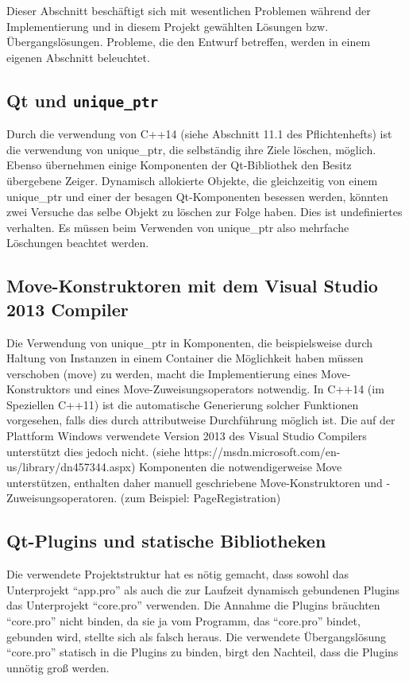 Dieser Abschnitt beschäftigt sich mit wesentlichen Problemen während der 
Implementierung und in diesem Projekt gewählten Lösungen bzw. Übergangslösungen.
Probleme, die den Entwurf betreffen, werden in einem eigenen Abschnitt beleuchtet.

\subsection{Qt und \texttt{unique\_ptr}}
Durch die verwendung von C++14 (siehe Abschnitt 11.1 des Pflichtenhefts) ist die verwendung von unique\_ptr, die selbständig ihre Ziele löschen, möglich. Ebenso übernehmen einige Komponenten der Qt-Bibliothek den Besitz übergebene Zeiger. Dynamisch allokierte Objekte, die gleichzeitig von einem unique\_ptr und einer der besagen Qt-Komponenten besessen werden, könnten zwei Versuche das selbe Objekt zu löschen zur Folge haben. Dies ist undefiniertes verhalten. Es müssen beim Verwenden von unique\_ptr also mehrfache Löschungen beachtet werden.

\subsection{Move-Konstruktoren mit dem Visual Studio 2013 Compiler}
Die Verwendung von unique\_ptr in Komponenten, die beispielsweise durch Haltung von Instanzen in einem Container die Möglichkeit haben müssen verschoben (move) zu werden, macht die Implementierung eines Move-Konstruktors und eines Move-Zuweisungsoperators notwendig. In C++14 (im Speziellen C++11) ist die automatische Generierung solcher Funktionen vorgesehen, falls dies durch attributweise Durchführung möglich ist. Die auf der Plattform Windows verwendete Version 2013 des Visual Studio Compilers unterstützt dies jedoch nicht. (siehe https://msdn.microsoft.com/en-us/library/dn457344.aspx)
Komponenten die notwendigerweise Move unterstützen, enthalten daher manuell geschriebene Move-Konstruktoren und -Zuweisungsoperatoren. (zum Beispiel: PageRegistration)

\subsection{Qt-Plugins und statische Bibliotheken}
Die verwendete Projektstruktur hat es nötig gemacht, dass sowohl das Unterprojekt \enquote{app.pro} als auch die zur Laufzeit dynamisch gebundenen Plugins das Unterprojekt \enquote{core.pro} verwenden.
Die Annahme die Plugins bräuchten \enquote{core.pro} nicht binden, da sie ja vom Programm, das \enquote{core.pro} bindet, gebunden wird, stellte sich als falsch heraus.
Die verwendete Übergangslösung \enquote{core.pro} statisch in die Plugins zu binden, birgt den Nachteil, dass die Plugins unnötig groß werden.
